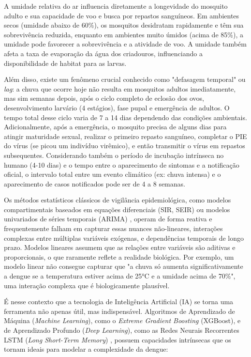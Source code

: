 A umidade relativa do ar influencia diretamente a longevidade do mosquito adulto e sua capacidade de voo e busca por repastos sanguíneos. Em ambientes secos (umidade abaixo de 60\%), os mosquitos desidratam rapidamente e têm sua sobrevivência reduzida, enquanto em ambientes muito úmidos (acima de 85\%), a umidade pode favorecer a sobrevivência e a atividade de voo. A umidade também afeta a taxa de evaporação da água dos criadouros, influenciando a disponibilidade de habitat para as larvas.

Além disso, existe um fenômeno crucial conhecido como "defasagem temporal" ou \textit{lag}: a chuva que ocorre hoje não resulta em mosquitos adultos imediatamente, mas sim semanas depois, após o ciclo completo de eclosão dos ovos, desenvolvimento larvário (4 estágios), fase pupal e emergência de adultos. O tempo total desse ciclo varia de 7 a 14 dias dependendo das condições ambientais. Adicionalmente, após a emergência, o mosquito precisa de alguns dias para atingir maturidade sexual, realizar o primeiro repasto sanguíneo, completar o PIE do vírus (se picou um indivíduo virêmico), e então transmitir o vírus em repastos subsequentes. Considerando também o período de incubação intrínseca no humano (4-10 dias) e o tempo entre o aparecimento de sintomas e a notificação oficial, o intervalo total entre um evento climático (ex: chuva intensa) e o aparecimento de casos notificados pode ser de 4 a 8 semanas.

Os métodos estatísticos clássicos de vigilância epidemiológica, como modelos compartimentais baseados em equações diferenciais (SIR, SEIR) ou modelos univariados de séries temporais (ARIMA) \cite{box2015time, hyndman2018forecasting}, operam de forma reativa e frequentemente falham em capturar essas nuances não-lineares, interações complexas entre múltiplas variáveis exógenas, e dependências temporais de longo prazo. Modelos lineares assumem que as relações entre variáveis são aditivas e proporcionais, o que raramente reflete a realidade biológica. Por exemplo, um modelo linear não consegue capturar que "a chuva só aumenta significativamente a dengue se a temperatura estiver acima de 25°C e a umidade acima de 70\%", uma interação complexa que é biologicamente plausível.

É nesse contexto que a tecnologia de Inteligência Artificial (IA) se torna uma ferramenta não apenas útil, mas indispensável. Algoritmos de Aprendizado de Máquina (\textit{Machine Learning}), como o \textit{Extreme Gradient Boosting} (XGBoost), e de Aprendizado Profundo (\textit{Deep Learning}), como as Redes Neurais Recorrentes LSTM (\textit{Long Short-Term Memory}) \cite{chen2025forecasting, xu2020dengue}, possuem capacidades intrínsecas que os tornam ideais para modelar a complexidade da dengue:

